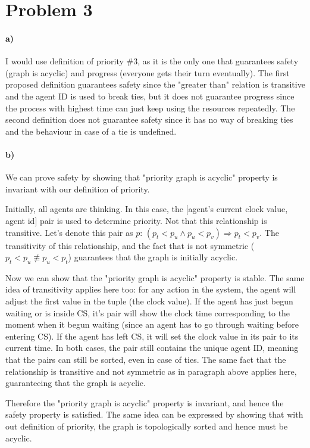\documentclass[10pt,letter]{article}
\begin{document}
\section*{Problem 3}

\paragraph{a)} I would use definition of priority \#3, as it is the only one that guarantees safety (graph is acyclic) and progress (everyone gets their turn eventually). The first proposed definition guarantees safety since the "greater than" relation is transitive and the agent ID is used to break ties, but it does not guarantee progress since the process with highest time can just keep using the resources repeatedly. The second definition does not guarantee safety since it has no way of breaking ties and the behaviour in case of a tie is undefined.

\paragraph{b)} We can prove safety by showing that "priority graph is acyclic" property is invariant with our definition of priority.

Initially, all agents are thinking. In this case, the [agent's current clock value, agent id] pair is used to determine priority. Not that this relationship is transitive. Let's denote this pair as $p$: ${(p_t < p_u \land p_u < p_v) \Rightarrow p_t < p_v}$. The transitivity of this relationship, and the fact that is not symmetric (${p_t < p_u \not\equiv p_u < p_t}$) guarantees that the graph is initially acyclic.

Now we can show that the "priority graph is acyclic" property is stable. The same idea of transitivity applies here too: for any action in the system, the agent will adjust the first value in the tuple (the clock value). If the agent has just begun waiting or is inside CS, it's pair will show the clock time corresponding to the moment when it begun waiting (since an agent has to go through waiting before entering CS). If the agent has left CS, it will set the clock value in its pair to its current time. In both cases, the pair still contains the unique agent ID, meaning that the pairs can still be sorted, even in case of ties. The same fact that the relationship is transitive and not symmetric as in paragraph above applies here, guaranteeing that the graph is acyclic.

Therefore the "priority graph is acyclic" property is invariant, and hence the safety property is satisfied. The same idea can be expressed by showing that with out definition of priority, the graph is topologically sorted and hence must be acyclic.
\end{document}
